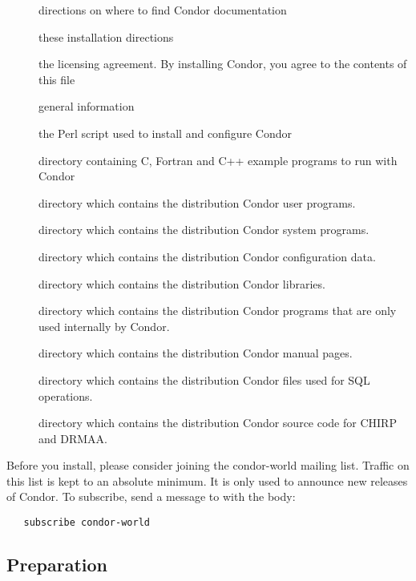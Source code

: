 \begin{description}
\item[] directions on where to find Condor documentation
\item[] these installation directions
\item[] the licensing agreement.
                  By installing Condor, you agree to the contents of
		  this file
\item[] general information
\item[] the Perl script used to install and
                  configure Condor
\item[] directory containing C, Fortran and C++ example
		  programs to run with Condor
\item[] directory which contains the distribution Condor
		  user programs.
\item[] directory which contains the distribution Condor
		  system programs.
\item[] directory which contains the distribution Condor
		  configuration data.
\item[] directory which contains the distribution Condor
		  libraries.
\item[] directory which contains the distribution Condor
		  programs that are only used internally by Condor.
\item[] directory which contains the distribution Condor
		  manual pages.
\item[] directory which contains the distribution Condor
                  files used for SQL operations.
\item[] directory which contains the distribution Condor
		  source code for CHIRP and DRMAA.
\end{description}

Before you install, please consider joining the condor-world mailing
list.
Traffic on this list is kept to an absolute minimum.
It is only used to announce new releases of Condor.
To subscribe, send a message to  with the body:
\begin{verbatim}
   subscribe condor-world 
\end{verbatim}

\subsection{\label{sec:Preparing-to-Install}Preparation} 

